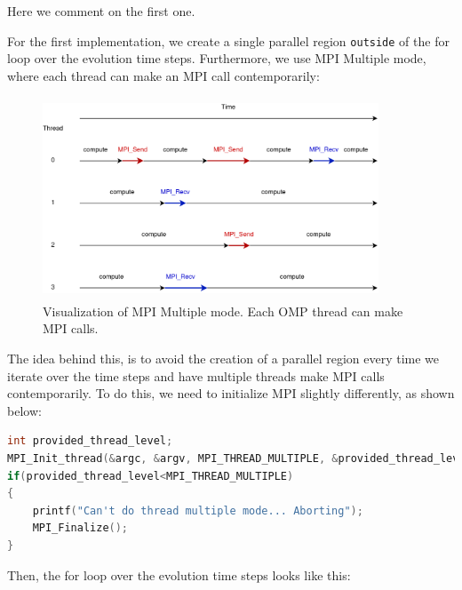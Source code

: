 \documentclass{report}
\begin{document}
Here we comment on the first one.

For the first implementation, we create a single parallel region \texttt{outside} 
of the for loop over the evolution time steps. Furthermore, we use MPI Multiple 
mode, where each thread can make an MPI call contemporarily:

\begin{figure}[H]
    \centering
    \includegraphics[width=10cm, height=6cm]{./other_images/mpi_multiple.png}
    \caption{\label{fig:mpi_multiple} Visualization of MPI Multiple mode. Each OMP 
    thread can make MPI calls.}
\end{figure}

The idea behind this, is to avoid the creation of a parallel region every time 
we iterate over the time steps and have multiple threads make MPI calls contemporarily. 
To do this, we need to initialize MPI slightly differently, as shown below:

\begin{lstlisting}[language=C++]
int provided_thread_level;
MPI_Init_thread(&argc, &argv, MPI_THREAD_MULTIPLE, &provided_thread_level);
if(provided_thread_level<MPI_THREAD_MULTIPLE)
{
    printf("Can't do thread multiple mode... Aborting");
    MPI_Finalize();
}
\end{lstlisting}

Then, the for loop over the evolution time steps looks like this:
\end{document}
